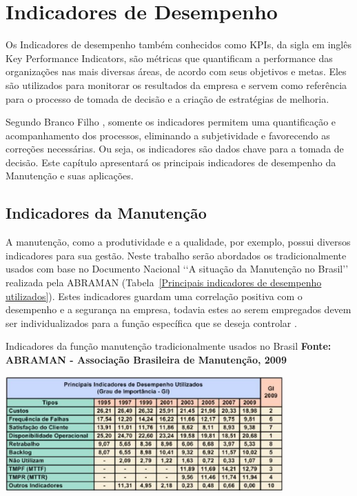 \chapter{Indicadores de Desempenho}
\label{indicadores}

Os Indicadores de desempenho também conhecidos como KPIs, da sigla em inglês Key Performance Indicators, são métricas que quantificam a performance das organizações nas mais diversas áreas, de acordo com seus objetivos e metas. Eles são utilizados para monitorar os resultados da empresa e servem como referência para o processo de tomada de decisão e a criação de estratégias de melhoria. 

Segundo Branco Filho \cite{branco2006indicadores}, somente os indicadores permitem uma quantificação e acompanhamento dos processos, eliminando a subjetividade e favorecendo as correções necessárias. Ou seja, os indicadores são dados chave para a tomada de decisão. Este capítulo apresentará os principais indicadores de desempenho da Manutenção e suas aplicações.

\section{Indicadores da Manutenção}
\label{SIM}

A manutenção, como a produtividade e a qualidade, por exemplo, possui diversos indicadores para sua gestão. Neste trabalho serão abordados os tradicionalmente usados com base no Documento Nacional {\lq\lq A situação da Manutenção no Brasil\rq\rq} realizada pela ABRAMAN (Tabela~\ref{Principais indicadores de desempenho utilizados}). Estes indicadores guardam uma correlação positiva com o desempenho e a segurança na empresa, todavia estes ao serem empregados devem ser individualizados para a função específica que se deseja controlar \cite{martorell1999}.

\graphicspath{{figuras/}}	
\begin{table}[H]
\centering
\caption{Indicadores da função manutenção tradicionalmente usados no Brasil \textbf{Fonte: ABRAMAN - Associação Brasileira de Manutenção, 2009}}
\includegraphics[width=0.8\textwidth]{PrincipaisIndicadores.eps}
\label{Principais indicadores de desempenho utilizados}
\end{table}

